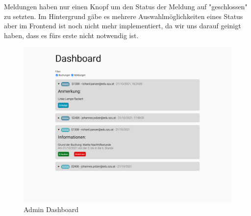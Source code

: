 Meldungen haben nur einen Knopf um den Status der Meldung auf "geschlossen" zu setzten. Im Hintergrund gäbe es mehrere Auswahlmöglichkeiten eines Status aber im Frontend ist noch nicht mehr implementiert, da wir uns darauf geinigt haben, dass es fürs erste nicht notwendig ist.

\begin{figure}[H]
    \centering
    \includegraphics[width=120mm]{media/WebComponents/AdminSeite_light.png}
    \caption{Admin Dashboard}
\end{figure}